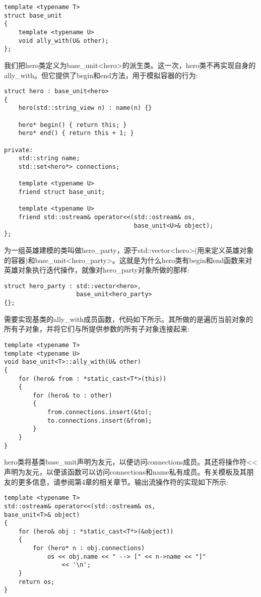 \begin{lstlisting}[style=styleCXX]
template <typename T>
struct base_unit
{
	template <typename U>
	void ally_with(U& other);
};
\end{lstlisting}

我们把hero类定义为base\_unit<hero>的派生类。这一次，hero类不再实现自身的ally\_with。但它提供了begin和end方法，用于模拟容器的行为:

\begin{lstlisting}[style=styleCXX]
struct hero : base_unit<hero>
{
	hero(std::string_view n) : name(n) {}
	
	hero* begin() { return this; }
	hero* end() { return this + 1; }
	
private:
	std::string name;
	std::set<hero*> connections;
	
	template <typename U>
	friend struct base_unit;
	
	template <typename U>
	friend std::ostream& operator<<(std::ostream& os,
									base_unit<U>& object);
};
\end{lstlisting}

为一组英雄建模的类叫做hero\_party，源于std::vector<hero>(用来定义英雄对象的容器)和base\_unit<hero\_party>。这就是为什么hero类有begin和end函数来对英雄对象执行迭代操作，就像对hero\_party对象所做的那样:

\begin{lstlisting}[style=styleCXX]
struct hero_party : std::vector<hero>,
					base_unit<hero_party>
{};
\end{lstlisting}

需要实现基类的ally\_with成员函数，代码如下所示。其所做的是遍历当前对象的所有子对象，并将它们与所提供参数的所有子对象连接起来:

\begin{lstlisting}[style=styleCXX]
template <typename T>
template <typename U>
void base_unit<T>::ally_with(U& other)
{
	for (hero& from : *static_cast<T*>(this))
	{
		for (hero& to : other)
		{
			from.connections.insert(&to);
			to.connections.insert(&from);
		}
	}
}
\end{lstlisting}

hero类将基类base\_unit声明为友元，以便访问connections成员。其还将操作符<{}<声明为友元，以便该函数可以访问connections和name私有成员。有关模板及其朋友的更多信息，请参阅第4章的相关章节。输出流操作符的实现如下所示:

\begin{lstlisting}[style=styleCXX]
template <typename T>
std::ostream& operator<<(std::ostream& os,
base_unit<T>& object)
{
	for (hero& obj : *static_cast<T*>(&object))
	{
		for (hero* n : obj.connections)
			os << obj.name << " --> [" << n->name << "]"
				<< '\n';
	}
	return os;
}
\end{lstlisting}

